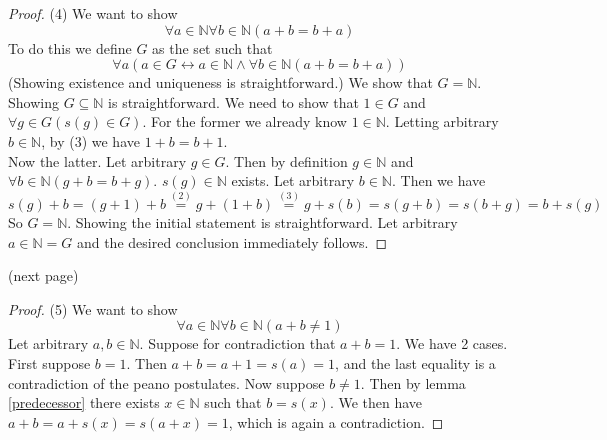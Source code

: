 \documentclass{report}
\begin{document}
\begin{proof}(4)
We want to show
\begin{equation*}
\forall a\in\mathbb N\forall b\in\mathbb N(a+b=b+a)
\end{equation*}
To do this we define $G$ as the set such that
\begin{equation*}
\forall a(a\in G\leftrightarrow a\in\mathbb N\land\forall b\in\mathbb N(a+b=b+a))
\end{equation*}
(Showing existence and uniqueness is straightforward.) We show that $G=\mathbb N$.
Showing $G\subseteq\mathbb N$ is straightforward. We need to show that $1\in G$ and $\forall g\in G(s(g)\in G)$. For the former we already know $1\in\mathbb N$. 
Letting arbitrary $b\in\mathbb N$, by (3) we have $1+b=b+1$.\\
\indent Now the latter. Let arbitrary $g\in G$. Then by definition $g\in\mathbb N$ and $\forall b\in\mathbb N(g+b=b+g)$. $s(g)\in\mathbb N$ exists. Let arbitrary $b\in\mathbb N$.
Then we have
\begin{equation*}
s(g)+b=(g+1)+b\overset{(2)}{=}g+(1+b)\overset{(3)}{=}g+s(b)=s(g+b)=s(b+g)=b+s(g)
\end{equation*}
So $G=\mathbb N$. Showing the initial statement is straightforward. Let arbitrary $a\in\mathbb N=G$ and the desired conclusion immediately follows.
\end{proof}
\noindent(next page)\newpage
\begin{proof}(5) We want to show
\begin{equation*}
\forall a\in\mathbb N\forall b\in\mathbb N(a+b\neq1)
\end{equation*}
Let arbitrary $a,b\in\mathbb N$. Suppose for contradiction that $a+b=1$. 
We have 2 cases. First suppose $b=1$. Then $a+b=a+1=s(a)=1$, and the last equality is a contradiction of the peano postulates. Now suppose $b\neq1$. Then by lemma \ref{predecessor} there exists
$x\in\mathbb N$ such that $b=s(x)$. We then have $a+b=a+s(x)=s(a+x)=1$, which is again a contradiction.
\end{proof}
\end{document}

